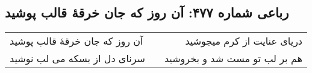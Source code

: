 \begin{center}
\section*{رباعی شماره ۴۷۷: آن روز که جان خرقهٔ قالب پوشید}
\label{sec:0477}
\begin{longtable}{l p{0.5cm} r}
آن روز که جان خرقهٔ قالب پوشید
&&
دریای عنایت از کرم میجوشید
\\
سرنای دل از بسکه می لب نوشید
&&
هم بر لب تو مست شد و بخروشید
\\
\end{longtable}
\end{center}
